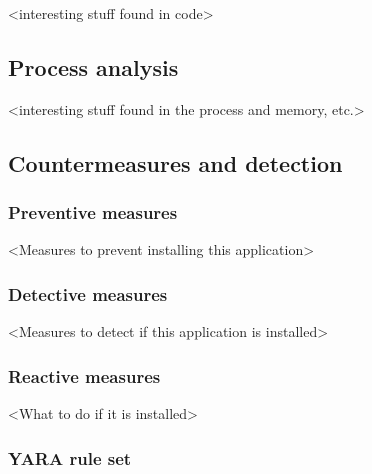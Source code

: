 <interesting stuff found in code>

\newpage
\subsection{Process analysis}

<interesting stuff found in the process and memory, etc.>

\newpage
\subsection{Countermeasures and detection}

\subsubsection{Preventive measures}


<Measures to prevent installing this application>

\subsubsection{Detective measures}

<Measures to detect if this application is installed>

\subsubsection{Reactive measures}

<What to do if it is installed>

\newpage
\subsubsection{YARA rule set}


